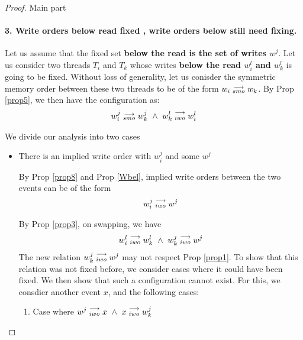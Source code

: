 \begin{proof}{Main part}
\begin{itemize}
\begin{enumerate}
                        \end{enumerate}

                \end{itemize}

            
            \paragraph{3. Write orders below read fixed , write orders below still need fixing.}
                Let us assume that the fixed set \textbf{below the read is the set of writes $w^j$}. Let us consider two threads $T_i$ and $T_k$ whose writes \textbf{below the read $w_i^l$ and $w_k^l$} is going to be fixed. Without loss of generality, let us conisder the symmetric memory order between these two threads to be of the form $w_i\stackrel{\longrightarrow}{_{smo}}w_k$.  By Prop \ref{prop5}, we then have the configuration as:
                \begin{align*}
                    \reln{w_i^j}{smo}{w_k^j} \ \wedge \ \reln{w_k^l}{iwo}{w_i^l}
                \end{align*}
                
                We divide our analysis into two cases 
                \begin{itemize}
                    \item There is an implied write order with $w_i^j$ and some $w^j$
                        
                        By Prop \ref{prop8} and Prop \ref{Wbel}, implied write orders between the two events can be of the form 
                        \begin{align*}
                            w_i^j\stackrel{\longrightarrow}{_{iwo}}w^j 
                        \end{align*}

                        By Prop \ref{prop3}, on swapping, we have 
                        \begin{align*}
                            \reln{w_i^l}{iwo}{w_k^l} \ \wedge \ \reln{w_k^j}{iwo}{w^j}
                        \end{align*}
                        The new relation $w_k^j\stackrel{\longrightarrow}{_{iwo}}w^j$ may not respect Prop \ref{prop1}. 
                        To show that this relation was not fixed before, we consider cases where it could have been fixed. We then show that such a configuration cannot exist. For this, we consdier another event $x$, and the following cases:

                        \begin{enumerate}
                            \item Case where $w^j\stackrel{\longrightarrow}{_{iwo}}x \ \wedge \ x\stackrel{\longrightarrow}{_{iwo}}w_k^j$
                        

\end{enumerate}
\end{itemize}
\end{proof}
